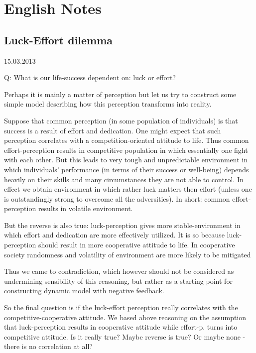 \newpage
\section{English Notes}
\subsection{Luck-Effort dilemma}
15.03.2013

Q: What is our life-success dependent on: luck or effort?

Perhaps it is mainly a matter of perception
but let us try to construct some simple model describing how this perception
transforms into reality.

Suppose that common perception (in some population of individuals)
is that success is a result of effort and dedication.
One might expect that such perception correlates with a competition-oriented
attitude to life.
Thus common effort-perception results in competitive population
in which essentially one fight with each other.
But this leads to very tough and unpredictable environment in which
individuals' performance (in terms of their success or well-being)
depends heavily on their skills and many circumstances they are not able to control.
In effect we obtain environment in which rather luck matters then effort
(unless one is outstandingly strong to overcome all the adversities).
In short: common effort-perception results in volatile environment.

But the reverse is also true: luck-perception gives more stable-environment
in which effort and dedication are more effectively utilized.
It is so because luck-perception should result in more cooperative attitude
to life.
In cooperative society randomness and volatility of environment are more likely to be mitigated

Thus we came to contradiction, which however should not be considered
as undermining sensibility of this reasoning, but rather as a starting point
for constructing dynamic model with negative feedback.

So the final question is if the luck-effort perception really correlates with
the competitive-cooperative attitude.
We based above reasoning on  the assumption that luck-perception results in cooperative attitude while effort-p. turns into competitive attitude.
Is it really true?
Maybe reverse is true?
Or maybe none - there is no correlation at all?


